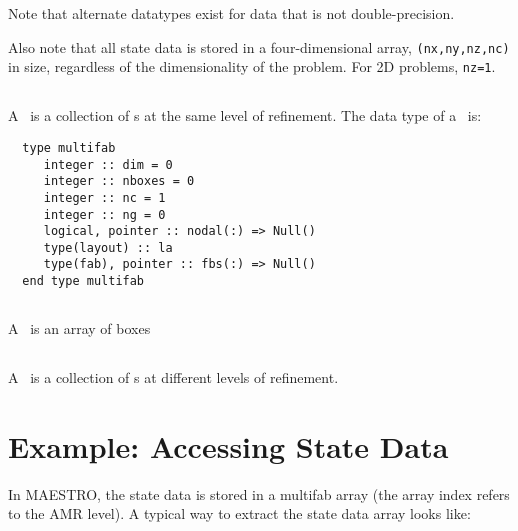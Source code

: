 Note that alternate datatypes exist for data that is not
double-precision.

Also note that all state data is stored in a four-dimensional array,
{\tt (nx,ny,nz,nc)} in size, regardless of the dimensionality of the
problem.  For 2D problems, {\tt nz=1}.

\subsection{\multifab}

A \multifab\ is a collection of \fab s at the same level of
refinement.  The data type of a \multifab\ is:
\begin{verbatim}
  type multifab
     integer :: dim = 0
     integer :: nboxes = 0
     integer :: nc = 1
     integer :: ng = 0
     logical, pointer :: nodal(:) => Null()
     type(layout) :: la
     type(fab), pointer :: fbs(:) => Null()
  end type multifab
\end{verbatim}


\subsection{\boxarray}

A \boxarray\ is an array of boxes

\subsection{\mlboxarray}

A \mlboxarray\ is a collection of \boxarray s at different levels of
refinement.

\subsection{\mllayout}


\subsection{\bctower}


\section{Example: Accessing State Data}

In MAESTRO, the state data is stored in a multifab array (the array
index refers to the AMR level).  A typical way to extract the state data
array looks like:

